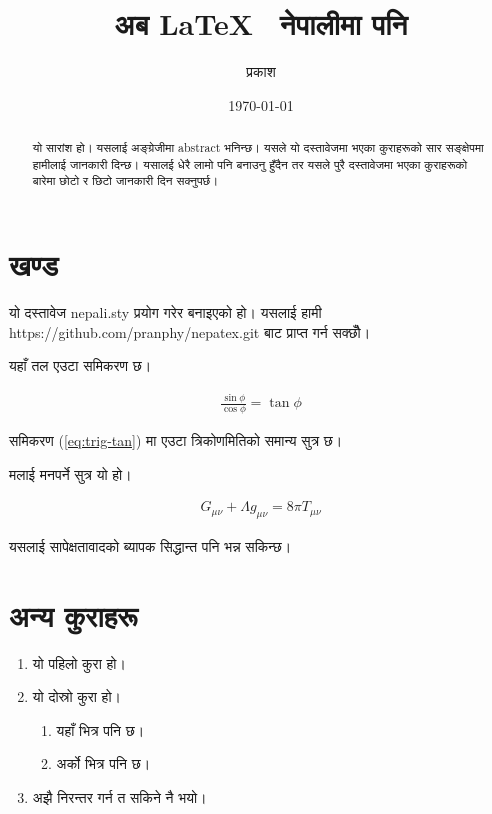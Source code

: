 \documentclass[a4paper]{article}
\title{अब \LaTeX ~ नेपालीमा पनि}
\date{\today}
\author{ प्रकाश}
\begin{document}
    \maketitle

    \begin{abstract}
        यो सारांश हो। यसलाई अङ्ग्रेजीमा abstract भनिन्छ। यसले यो दस्तावेजमा भएका कुराहरूको सार सङ्क्षेपमा हामीलाई जानकारी दिन्छ। यसालई धेरै लामो पनि बनाउनु हुँदैन तर यसले पुरै दस्तावेजमा भएका कुराहरूको बारेमा छोटो र छिटो जानकारी दिन सक्नुपर्छ।
    \end{abstract}

    \tableofcontents
    \section{खण्ड}
        यो दस्तावेज nepali.sty प्रयोग गरेर बनाइएको हो। यसलाई हामी https://github.com/pranphy/nepatex.git बाट प्राप्त गर्न सक्छौँ।

        यहाँ तल एउटा समिकरण छ।

        \begin{align} \label{eq:trig-tan}
            \frac{\sin{\phi}}{\cos{\phi}} = \tan{\phi}
        \end{align}
        
        समिकरण (\ref{eq:trig-tan}) मा एउटा त्रिकोणमितिको समान्य सुत्र छ।

        मलाई मनपर्ने सुत्र यो हो।

        \begin{align*}
            G_{\mu\nu} + \Lambda g_{\mu\nu} = 8\pi T_{\mu\nu}
        \end{align*}

        यसलाई सापेक्षतावादको ब्यापक सिद्धान्त पनि भन्न सकिन्छ।

    \section{अन्य कुराहरू}

        \begin{enumerate}
            \item यो पहिलो कुरा हो।
            \item यो दोस्रो कुरा हो।
            \begin{enumerate}
                \item यहाँ भित्र  पनि छ। 
                \item अर्को भित्र  पनि छ। 
            \end{enumerate}
            \item अझै निरन्तर गर्न त सकिने नै भयो।
        \end{enumerate}
\end{document}
